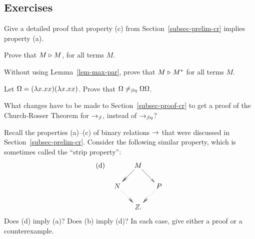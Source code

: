 \documentclass{article}
\begin{document}
\subsection{Exercises}

\begin{exercise}
  Give a detailed proof that property (c) from
  Section~\ref{subsec-prelim-cr} implies property (a).
\end{exercise}

\begin{exercise}
  Prove that $M\mathrel{\triangleright} M$, for all terms $M$.
\end{exercise}

\begin{exercise}
  Without using Lemma~\ref{lem-max-par}, prove that $M\mathrel{\triangleright} M^*$ for
  all terms $M$.
\end{exercise}

\begin{exercise}
  Let $\Omega=(\lambda x.xx)(\lambda x.xx)$. Prove that
  $\Omega\not=_{\beta\eta}\Omega\Omega$.
\end{exercise}

\begin{exercise}
  What changes have to be made to Section~\ref{subsec-proof-cr} to get
  a proof of the Church-Rosser Theorem for $\rightarrow_{\beta}$, instead of
  $\rightarrow_{\beta\eta}$?
\end{exercise}

\begin{exercise}
  Recall the properties (a)--(c) of binary relations $\rightarrow$ that were
  discussed in Section~\ref{subsec-prelim-cr}. Consider the following
  similar property, which is sometimes called the ``strip property'':
  \[ \mbox{(d)} \ssep \xymatrix@dr{M\ar@{->}[r]\ar@{->>}[d] & P\ar@{.>>}[d]\\ N\ar@{.>>}[r] & Z.}
  \]
  Does (d) imply (a)? Does (b) imply (d)? In each case, give either a
  proof or a counterexample.
\end{exercise}
\end{document}
